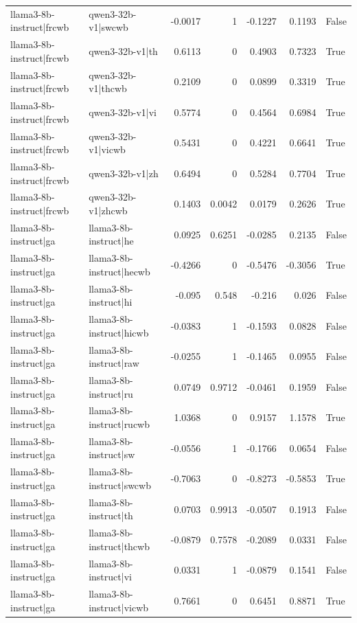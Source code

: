 \begin{table}
\begin{tabular}{l l r r r r l}
llama3-8b-instruct|frcwb & qwen3-32b-v1|swcwb & -0.0017 & 1 & -0.1227 & 0.1193 & False \\
llama3-8b-instruct|frcwb & qwen3-32b-v1|th & 0.6113 & 0 & 0.4903 & 0.7323 & True \\
llama3-8b-instruct|frcwb & qwen3-32b-v1|thcwb & 0.2109 & 0 & 0.0899 & 0.3319 & True \\
llama3-8b-instruct|frcwb & qwen3-32b-v1|vi & 0.5774 & 0 & 0.4564 & 0.6984 & True \\
llama3-8b-instruct|frcwb & qwen3-32b-v1|vicwb & 0.5431 & 0 & 0.4221 & 0.6641 & True \\
llama3-8b-instruct|frcwb & qwen3-32b-v1|zh & 0.6494 & 0 & 0.5284 & 0.7704 & True \\
llama3-8b-instruct|frcwb & qwen3-32b-v1|zhcwb & 0.1403 & 0.0042 & 0.0179 & 0.2626 & True \\
llama3-8b-instruct|ga & llama3-8b-instruct|he & 0.0925 & 0.6251 & -0.0285 & 0.2135 & False \\
llama3-8b-instruct|ga & llama3-8b-instruct|hecwb & -0.4266 & 0 & -0.5476 & -0.3056 & True \\
llama3-8b-instruct|ga & llama3-8b-instruct|hi & -0.095 & 0.548 & -0.216 & 0.026 & False \\
llama3-8b-instruct|ga & llama3-8b-instruct|hicwb & -0.0383 & 1 & -0.1593 & 0.0828 & False \\
llama3-8b-instruct|ga & llama3-8b-instruct|raw & -0.0255 & 1 & -0.1465 & 0.0955 & False \\
llama3-8b-instruct|ga & llama3-8b-instruct|ru & 0.0749 & 0.9712 & -0.0461 & 0.1959 & False \\
llama3-8b-instruct|ga & llama3-8b-instruct|rucwb & 1.0368 & 0 & 0.9157 & 1.1578 & True \\
llama3-8b-instruct|ga & llama3-8b-instruct|sw & -0.0556 & 1 & -0.1766 & 0.0654 & False \\
llama3-8b-instruct|ga & llama3-8b-instruct|swcwb & -0.7063 & 0 & -0.8273 & -0.5853 & True \\
llama3-8b-instruct|ga & llama3-8b-instruct|th & 0.0703 & 0.9913 & -0.0507 & 0.1913 & False \\
llama3-8b-instruct|ga & llama3-8b-instruct|thcwb & -0.0879 & 0.7578 & -0.2089 & 0.0331 & False \\
llama3-8b-instruct|ga & llama3-8b-instruct|vi & 0.0331 & 1 & -0.0879 & 0.1541 & False \\
llama3-8b-instruct|ga & llama3-8b-instruct|vicwb & 0.7661 & 0 & 0.6451 & 0.8871 & True \\

\end{tabular}
\end{table}
